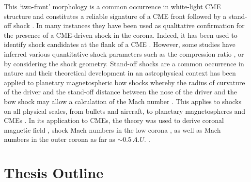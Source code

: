 This `two-front' morphology is a common occurrence in white-light CME structure and constitutes a reliable signature of a CME front followed by a stand-off shock \citep{vourlidas2013}. In many instances they have been used as qualitative confirmation for the presence of a CME-driven shock in the corona. Indeed, it has been used to identify shock candidates at the flank of a CME \citep{vourlidas2003}. However, some studies have inferred various quantitative shock parameters such as the compression ratio \citep{ontiveros2009}, or by considering the shock geometry. Stand-off shocks are a common occurrence in nature and their theoretical development in an astrophysical context has been applied to planetary magnetospheric bow shocks whereby the radius of curvature of the driver and the stand-off distance between the nose of the driver and the bow shock may allow a calculation of the Mach number \citep{spreiter1966}. This applies to shocks on all physical scales, from bullets and aircraft, to planetary magnetospheres and CMEs \citep{russel2002}. In its application to CMEs, the theory was used to derive coronal magnetic field \citep{kim2012}, shock Mach numbers in the low corona \citep{gopal2012}, as well as Mach numbers in the outer corona as far as $\sim0.5\,A.U.$ \citep{maloney2011}. 




\section{Thesis Outline}

